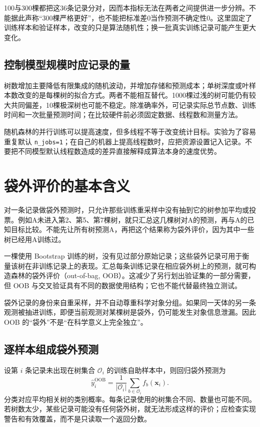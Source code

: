 100与300棵都把这36条记录分对，因而本指标无法在两者之间提供进一步分辨。不能据此声称“300棵严格更好”，也不能把标准差0当作预测不确定性0。这里固定了训练样本和验证样本，改变的只是算法随机性；换一批真实训练记录可能产生更大变化。

\subsection{控制模型规模时应记录的量}
树数增加主要降低有限集成的随机波动，并增加存储和预测成本；单树深度或叶样本数改变的是每棵树的拟合方式。两者不能相互替代。1000棵过浅的树可能仍有较大共同偏差，10棵极深树也可能不稳定。除准确率外，可记录实际总节点数、训练时间和一次批量预测时间；在比较硬件前必须固定数据、线程数和测量方法。

随机森林的并行训练可以提高速度，但多线程不等于改变统计目标。实验为了容易重复默认 \texttt{n\_jobs=1}；在自己的机器上提高线程数时，应把资源设置记入记录。不要把不同模型默认线程数造成的差异直接解释成算法本身的速度优势。

\section{袋外评价的基本含义}

对一条记录做袋外预测时，只允许那些训练重采样中没有抽到它的树参加平均或投票。例如A未进入第2、第5、第7棵树，就只汇总这几棵树对A的预测，再与A的已知目标比较。不能先让所有树预测A，再把这个结果称为袋外评价，因为其中一些树已经用A训练过。

一棵使用 Bootstrap 训练的树，没有见过部分原始记录；这些袋外记录可用于衡量该树在非训练记录上的表现。汇总每条训练记录在相应袋外树上的预测，就可构造森林的袋外评价（out-of-bag, OOB）。这减少了另行划出验证集的一部分需要，但 OOB 与交叉验证具有不同的数据使用结构；它也不能代替最终独立测试。

袋外记录的身份来自重采样，并不自动尊重科学对象分组。如果同一天体的另一条观测被抽进训练，即便当前观测对某棵树是袋外，仍可能发生对象信息泄漏。因此 OOB 的“袋外”不是“在科学意义上完全独立”。

\subsection{逐样本组成袋外预测}
设第 $i$ 条记录未出现在树集合 $\mathcal O_i$ 的训练自助样本中，则回归袋外预测为
\[
\hat y_i^{\mathrm{OOB}}=\frac1{|\mathcal O_i|}\sum_{b\in\mathcal O_i}f_b(\mathbf x_i).
\]
分类对应平均相关树的类别概率。每条记录使用的树集合不同、数量也可能不同。若树数太少，某些记录可能没有任何袋外树，就无法形成这样的评价；应检查实现警告和有效覆盖，而不是只读取一个返回分数。

